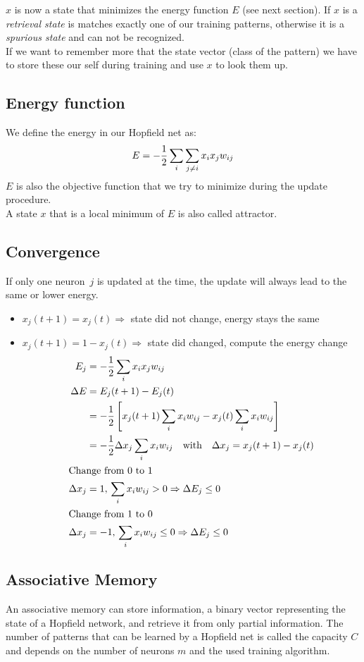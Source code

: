 $x$ is now a state that minimizes the energy function $E$ (see next section). If $x$ is a \emph{retrieval state} is matches exactly one of our training patterns, otherwise it is a \emph{spurious state} and can not be recognized.\\
If we want to remember more that the state vector (\eg class of the pattern) we have to store these our self during training and use $x$ to look them up.

\subsection{Energy function}%
We define the energy in our Hopfield net as:
\begin{equation}
E = -\frac{1}{2} \sum_i \sum_{j\neq i} x_i x_j w_{ij}
\end{equation}
$E$ is also the objective function that we try to minimize during the update procedure.\\
A state $x$ that is a local minimum of $E$ is also called attractor.

\subsection{Convergence}
If only one neuron~$j$ is updated at the time, the update will always lead to the same or lower energy.
\begin{itemize}
\item $x_j(t+1) = x_j(t) \Rightarrow$ state did not change, energy stays the same
\item $x_j(t+1) = 1 - x_j(t) \Rightarrow$ state did changed, compute the energy change
	\begin{align}
	E_j &= -\frac{1}{2} \sum_i x_i x_j w_{ij}\\
	\Delta E &= E_j(t+1) - E_j(t)\\
	&= -\frac{1}{2} \left[ x_j(t+1) \sum_i x_i w_{ij} - x_j(t) \sum_i x_i w_{ij} \right]\\
	&= -\frac{1}{2} \Delta x_j \sum_i x_i w_{ij} \quad\text{with}\quad	\Delta x_j = x_j(t+1) - x_j(t)\\
	\intertext{Change from 0 to 1}
	\Delta x_j &= 1,\,\sum_i x_i w_{ij} > 0 \Rightarrow \Delta E_j \leq 0\\
	\intertext{Change from 1 to 0}
	\Delta x_j &= -1,\,\sum_i x_i w_{ij} \leq 0 \Rightarrow \Delta E_j \leq 0
	\end{align}
\end{itemize}

\subsection{Associative Memory}
An associative memory can store information, \eg a binary vector representing the state of a Hopfield network, and retrieve it from only partial information. The number of patterns that can be learned by a Hopfield net is called the capacity $C$ and depends on the number of neurons $m$ and the used training algorithm.

